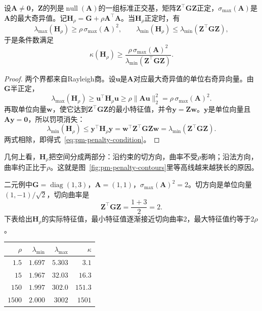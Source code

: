 \begin{lemma}[罚函数Hessian的条件数]
\label{lem:pm-penalty-condition}
设$\bm{A}\neq\bm{0}$，$\bm{Z}$的列是$\operatorname{null}(\bm{A})$的一组标准正交基，矩阵$\bm{Z}^\top\bm{G}\bm{Z}$正定，$\sigma_{\max}(\bm{A})$是$\bm{A}$的最大奇异值。记$\bm{H}_\rho=\bm{G}+\rho\bm{A}^\top\bm{A}$。当$\bm{H}_\rho$正定时，有
\begin{equation}
 \lambda_{\max}(\bm{H}_\rho)\geq\rho\,\sigma_{\max}(\bm{A})^2,\qquad
 \lambda_{\min}(\bm{H}_\rho)\leq\lambda_{\min}(\bm{Z}^\top\bm{G}\bm{Z}),
 \label{eq:pm-penalty-eigen-bounds}
\end{equation}
于是条件数满足
\begin{equation}
 \kappa(\bm{H}_\rho)\geq\frac{\rho\,\sigma_{\max}(\bm{A})^2}{\lambda_{\min}(\bm{Z}^\top\bm{G}\bm{Z})}.
 \label{eq:pm-penalty-condition}
\end{equation}
\end{lemma}

\begin{proof}
两个界都来自Rayleigh商。设$\bm{u}$是$\bm{A}$对应最大奇异值的单位右奇异向量。由$\bm{G}$半正定，
\[
 \lambda_{\max}(\bm{H}_\rho)\geq\bm{u}^\top\bm{H}_\rho\bm{u}\geq\rho\lVert\bm{A}\bm{u}\rVert_2^2=\rho\,\sigma_{\max}(\bm{A})^2 .
\]
再取单位向量$\bm{w}$，使它达到$\bm{Z}^\top\bm{G}\bm{Z}$的最小特征值，并令$\bm{y}=\bm{Z}\bm{w}$。$\bm{y}$是单位向量且$\bm{A}\bm{y}=\bm{0}$，所以罚项消失：
\[
 \lambda_{\min}(\bm{H}_\rho)\leq\bm{y}^\top\bm{H}_\rho\bm{y}=\bm{w}^\top\bm{Z}^\top\bm{G}\bm{Z}\bm{w}=\lambda_{\min}(\bm{Z}^\top\bm{G}\bm{Z}).
\]
两式相除，即得式~\eqref{eq:pm-penalty-condition}。
\end{proof}

几何上看，$\bm{H}_\rho$把空间分成两部分：沿约束的切方向，曲率不受$\rho$影响；沿法方向，曲率约正比于$\rho$。这就是图~\ref{fig:pm-penalty-contours}里等高线越来越狭长的原因。

二元例中$\bm{G}=\operatorname{diag}(1,3)$，$\bm{A}=(1,1)$，$\sigma_{\max}(\bm{A})^2=2$。切方向是单位向量$(1,-1)/\sqrt2$，切向曲率是
\[
 \bm{Z}^\top\bm{G}\bm{Z}=\frac{1+3}{2}=2 .
\]
下表给出$\bm{H}_\rho$的实际特征值，最小特征值逐渐接近切向曲率$2$，最大特征值约等于$2\rho$。

\begin{BookInlineTable}
  \centering
  \begin{tabular}{@{}rrrr@{}}
    \toprule
    $\rho$ & $\lambda_{\min}$ & $\lambda_{\max}$ & $\kappa$\\
    \midrule
    $1.5$ & $1.697$ & $5.303$ & $3.1$\\
    $15$ & $1.967$ & $32.03$ & $16.3$\\
    $150$ & $1.997$ & $302.0$ & $151.3$\\
    $1500$ & $2.000$ & $3002$ & $1501$\\
    \bottomrule
  \end{tabular}
  \caption{二元例中罚函数Hessian的特征值与条件数。}
  \label{tab:pm-penalty-condition}
\end{BookInlineTable}

